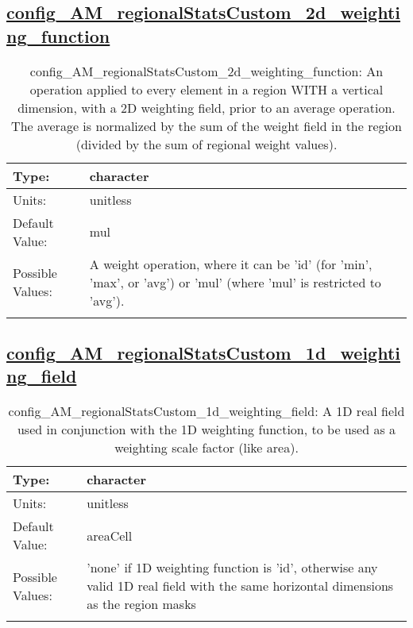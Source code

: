 \subsection[config\_AM\_regionalStatsCustom\_2d\_weighting\_function]{\hyperref[sec:nm_tab_AM_regionalStatsCustom]{config\_AM\_regionalStatsCustom\_2d\_weighting\_function}}
\label{subsec:nm_sec_config_AM_regionalStatsCustom_2d_weighting_function}
\begin{center}
\begin{longtable}{| p{2.0in} || p{4.0in} |}
    \hline
    Type: & character \\
    \hline
    Units: & \si{unitless} \\
    \hline
    Default Value: & mul \\
    \hline
    Possible Values: & A weight operation, where it can be 'id' (for 'min', 'max', or 'avg') or 'mul' (where 'mul' is restricted to 'avg'). \\
    \hline
    \caption{config\_AM\_regionalStatsCustom\_2d\_weighting\_function: An operation applied to every element in a region WITH a vertical dimension, with a 2D weighting field, prior to an average operation. The average is normalized by the sum of the weight field in the region (divided by the sum of regional weight values).}
\end{longtable}
\end{center}
\subsection[config\_AM\_regionalStatsCustom\_1d\_weighting\_field]{\hyperref[sec:nm_tab_AM_regionalStatsCustom]{config\_AM\_regionalStatsCustom\_1d\_weighting\_field}}
\label{subsec:nm_sec_config_AM_regionalStatsCustom_1d_weighting_field}
\begin{center}
\begin{longtable}{| p{2.0in} || p{4.0in} |}
    \hline
    Type: & character \\
    \hline
    Units: & \si{unitless} \\
    \hline
    Default Value: & areaCell \\
    \hline
    Possible Values: & 'none' if 1D weighting function is 'id', otherwise any valid 1D real field with the same horizontal dimensions as the region masks \\
    \hline
    \caption{config\_AM\_regionalStatsCustom\_1d\_weighting\_field: A 1D real field used in conjunction with the 1D weighting function, to be used as a weighting scale factor (like area).}
\end{longtable}
\end{center}

